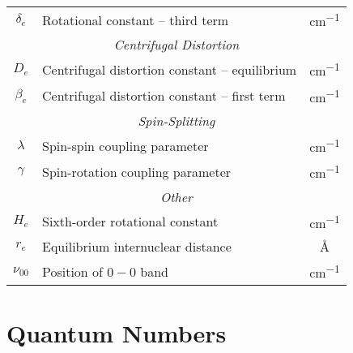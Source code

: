 \documentclass[11pt, twoside, fleqn]{report}
\newcommand{\dash}{\!-\!}
\begin{document}
\begin{table}[H]
\begin{tabular}{clc}
            $\delta_e$      & Rotational constant -- third term                                            & \unit{cm^{-1}}   \\
            \multicolumn{3}{c}{\textit{Centrifugal Distortion}}                                                                 \\
            \cmidrule(lr){1-3}
            $D_e$           & Centrifugal distortion constant -- equilibrium                               & \unit{cm^{-1}}   \\
            $\beta_e$       & Centrifugal distortion constant -- first term                                & \unit{cm^{-1}}   \\
            \multicolumn{3}{c}{\textit{Spin-Splitting}}                                                                         \\
            \cmidrule(lr){1-3}
            $\lambda$         & Spin-spin coupling parameter                                                 & \unit{cm^{-1}}   \\
            $\gamma$          & Spin-rotation coupling parameter                                             & \unit{cm^{-1}}   \\
            \multicolumn{3}{c}{\textit{Other}}                                                                                  \\
            \cmidrule(lr){1-3}
            $H_e$           & Sixth-order rotational constant                                              & \unit{cm^{-1}}   \\
            $r_e$           & Equilibrium internuclear distance                                            & \unit{\angstrom} \\
            $\nu_{00}$        & Position of $0\dash0$ band                                                   & \unit{cm^{-1}}   \\
            \bottomrule
        \end{tabular}
    \end{table}

    \chapter{Quantum Numbers}
    \label{a:quantum_numbers}
\end{document}
